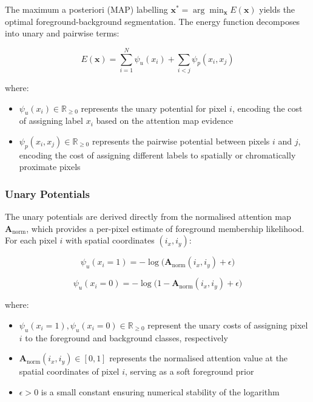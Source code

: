 The maximum a posteriori (MAP) labelling $\mathbf{x}^{*} = \arg\min_{\mathbf{x}} E(\mathbf{x})$ yields the optimal foreground-background segmentation. The energy function decomposes into unary and pairwise terms:

\begin{equation}
\label{eq:crf_energy}
E(\mathbf{x}) = \sum_{i=1}^{N} \psi_u(x_i) + \sum_{i < j} \psi_p(x_i, x_j)
\end{equation}

where:
\begin{itemize}
\item $\psi_u(x_i) \in \mathbb{R}_{\geq 0}$ represents the unary potential for pixel $i$, encoding the cost of assigning label $x_i$ based on the attention map evidence
\item $\psi_p(x_i, x_j) \in \mathbb{R}_{\geq 0}$ represents the pairwise potential between pixels $i$ and $j$, encoding the cost of assigning different labels to spatially or chromatically proximate pixels
\end{itemize}

\subsubsection{Unary Potentials}

The unary potentials are derived directly from the normalised attention map $\mathbf{A}_{\text{norm}}$, which provides a per-pixel estimate of foreground membership likelihood. For each pixel $i$ with spatial coordinates $(i_x, i_y)$:

\begin{equation}
\psi_u(x_i = 1) = -\log\!\bigl(\mathbf{A}_{\text{norm}}(i_x, i_y) + \epsilon\bigr)
\end{equation}

\begin{equation}
\psi_u(x_i = 0) = -\log\!\bigl(1 - \mathbf{A}_{\text{norm}}(i_x, i_y) + \epsilon\bigr)
\end{equation}

where:
\begin{itemize}
\item $\psi_u(x_i = 1), \psi_u(x_i = 0) \in \mathbb{R}_{\geq 0}$ represent the unary costs of assigning pixel $i$ to the foreground and background classes, respectively
\item $\mathbf{A}_{\text{norm}}(i_x, i_y) \in [0,1]$ represents the normalised attention value at the spatial coordinates of pixel $i$, serving as a soft foreground prior
\item $\epsilon > 0$ is a small constant ensuring numerical stability of the logarithm
\end{itemize}

